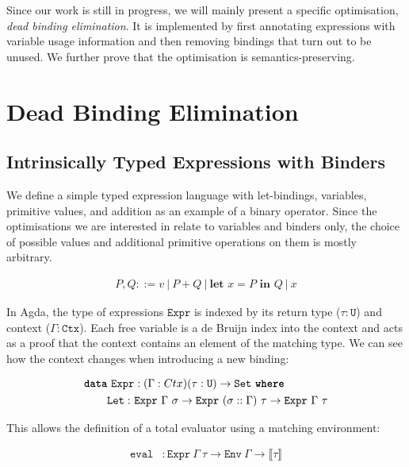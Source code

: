 \documentclass[acmsmall,nonacm,review,timestamp]{acmart}
\newcommand{\I}[1]{\texttt{#1}\xspace}
\newcommand{\K}[1]{\textbf{\texttt{#1}}\xspace}
\newcommand{\U}{\texttt{U}\xspace}
\newcommand{\Expr}{\texttt{Expr}\xspace}
\newcommand{\Ctx}{\texttt{Ctx}\xspace}
\newcommand{\Env}{\texttt{Env}\xspace}
\newcommand{\Interpret}[1]{\llbracket #1 \rrbracket\xspace}
\begin{document}
Since our work is still in progress,
we will mainly present a specific optimisation, \emph{dead binding elimination}.
It is implemented by first annotating expressions with variable usage information
and then removing bindings that turn out to be unused.
We further prove that the optimisation is semantics-preserving.


\section{Dead Binding Elimination}

\subsection{Intrinsically Typed Expressions with Binders}

We define a simple typed expression language with let-bindings,
variables, primitive values, and addition as an example of a binary operator.
Since the optimisations we are interested in relate to variables and binders only,
the choice of possible values and additional primitive operations on them is mostly arbitrary.

\begin{align*}
  P, Q ::= v
  \ \big|\  P + Q
  \ \big|\  \textbf{let } x = P \textbf{ in } Q
  \ \big|\  x
\end{align*}

In Agda, the type of expressions $\Expr$ is indexed by its return type ($\tau : \U$)
and context ($\Gamma : \Ctx$).
Each free variable is a de Bruijn index into the context and acts as a proof that
the context contains an element of the matching type.
We can see how the context changes when introducing a new binding:

\begin{align*}
  \K{data}\ \I{Expr}& : (\Gamma : Ctx) (\tau : \I{U}) \to \I{Set}\ \K{where} \\
  \I{Let}
    :\ &\I{Expr}\ \Gamma\ \sigma \to
        \I{Expr}\ (\sigma :: \Gamma)\ \tau \to
        \I{Expr}\ \Gamma\ \tau
\end{align*}

This allows the definition of a total evaluator
using a matching environment:

\begin{align*}
  \I{eval} &: \I{Expr}\ \Gamma\ \tau \to \I{Env}\ \Gamma \to \Interpret{\tau}
\end{align*}
\end{document}
